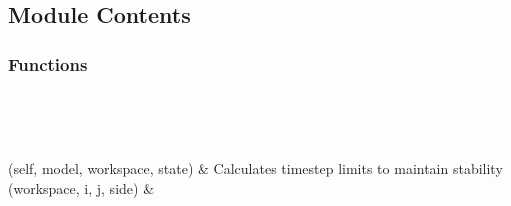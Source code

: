 \documentclass[letterpaper,10pt,english]{sphinxmanual}
\begin{document}
\subsection{Module Contents}
\label{\detokenize{autoapi/stability/index:module-contents}}

\subsubsection{Functions}
\label{\detokenize{autoapi/stability/index:functions}}

\begin{savenotes}\sphinxatlongtablestart\begin{longtable}[c]{}
\hline

\endfirsthead

%
{}\\
\hline

\endhead

\hline
{}\\
\endfoot

\endlastfoot

\sphinxAtStartPar
{\hyperref[\detokenize{autoapi/stability/index:stability.stability}]{}}(self, model, workspace, state)
&
\sphinxAtStartPar
Calculates timestep limits to maintain stability
\\
\hline
\sphinxAtStartPar
{\hyperref[\detokenize{autoapi/stability/index:stability.edge}]{}}(workspace, i, j, side)
&
\sphinxAtStartPar

\\
\hline
\end{longtable}\sphinxatlongtableend\end{savenotes}
\end{document}
